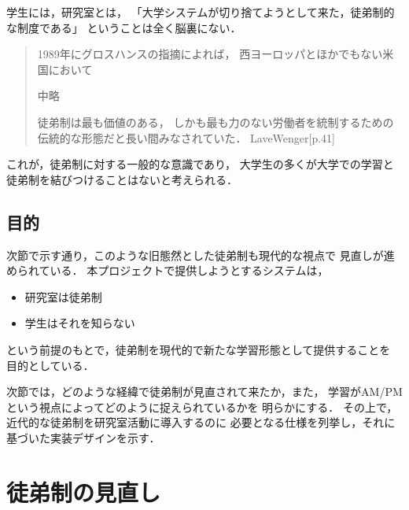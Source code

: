 \documentclass[a4,p11]{article}
\begin{document}
学生には，研究室とは，
「大学システムが切り捨てようとして来た，徒弟制的な制度である」
ということは全く脳裏にない．
\begin{quote}
1989年にグロスハンスの指摘によれば，
西ヨーロッパとほかでもない米国において

中略

徒弟制は最も価値のある，
しかも最も力のない労働者を統制するための伝統的な形態だと長い間みなされていた．
LaveWenger[p.41]
\end{quote}
これが，徒弟制に対する一般的な意識であり，
大学生の多くが大学での学習と徒弟制を結びつけることはないと考えられる．

\subsection{目的}
\label{sec:org61f3643}
次節で示す通り，このような旧態然とした徒弟制も現代的な視点で
見直しが進められている．
本プロジェクトで提供しようとするシステムは，
\begin{itemize}
\item 研究室は徒弟制
\item 学生はそれを知らない
\end{itemize}
という前提のもとで，徒弟制を現代的で新たな学習形態として提供することを
目的としている．

次節では，どのような経緯で徒弟制が見直されて来たか，また，
学習がAM/PMという視点によってどのように捉えられているかを
明らかにする．
その上で，近代的な徒弟制を研究室活動に導入するのに
必要となる仕様を列挙し，それに基づいた実装デザインを示す．

\section{徒弟制の見直し}
\label{sec:orgf4f482c}
\end{document}
